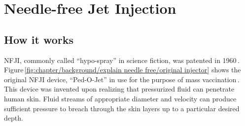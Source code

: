     

\section{Needle-free Jet Injection}                 \label{Chapter:background/needle-free jet injection}
    
    
    \subsection{How it works}                       \label{Chapter:background/needle-free jet injection/how it works}
    
        \ac{NFJI}, commonly called “hypo-spray” in science fiction, was patented in 1960\,\cite{ismach1962}. Figure\,\ref{fig:chapter/background/explain needle free/original injector} shows the original \acs{NFJI} device, “Ped-O-Jet” in use for the purpose of mass vaccination\,\cite{DictionnairesetEncyclopediessurAcademic}. This device was invented  upon realizing that pressurized fluid can penetrate human skin. Fluid streams of appropriate diameter and velocity can produce sufficient pressure to breach through the skin layers up to a particular desired depth. 
        

